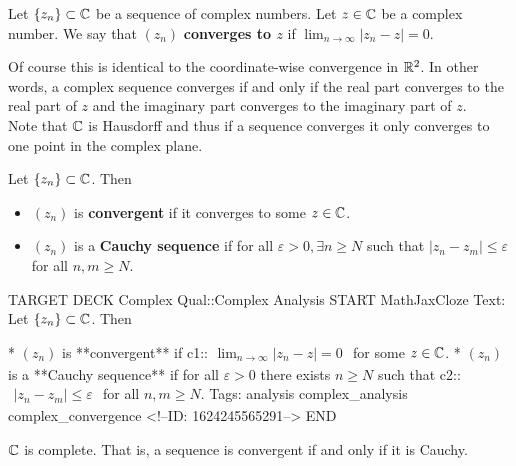 \documentclass{memoir}
\begin{document}
\begin{defn}
	Let \(\left\{ z_n \right\}  \subset \mathbb{C}\) be a sequence of complex numbers. Let \(z \in \mathbb{C}\) be a complex number. We say that \((z_n)\) \textbf{converges to \(z\)} if \(\lim_{n \to \infty} \left| z_n-z \right| =0\).
\end{defn}
Of course this is identical to the coordinate-wise convergence in \(\mathbb{R}^2\). In other words, a complex sequence converges if and only if the real part converges to the real part of \(z\) and the imaginary part converges to the imaginary part of \(z\).\\

Note that \(\C\) is Hausdorff and thus if a sequence converges it only converges to one point in the complex plane.
\begin{defn}
	Let \(\left\{ z_n \right\} \subset \mathbb{C}\). Then
	\begin{itemize}
		\item \((z_n)\) is \textbf{convergent} if it converges to some \(z \in \mathbb{C}\).
		\item \((z_n)\) is a \textbf{Cauchy sequence} if for all \(\varepsilon>0, \exists n\geq N\) such that \(\left| z_n-z_m \right|\leq \varepsilon\) for all \(n,m \geq N\).
	\end{itemize}
\end{defn}

\begin{anki}
TARGET DECK
Complex Qual::Complex Analysis
START
MathJaxCloze
Text: Let \(\left\{ z_n \right\} \subset \mathbb{C}\). Then

* \((z_n)\) is **convergent** if
{{c1::\(\begin{align*}
        	\lim_{n \to \infty} \left| z_n - z \right| = 0
        \end{align*}\)}} 
for some \(z \in \mathbb{C}\).
* \((z_n)\) is a **Cauchy sequence** if for all \(\varepsilon>0\) there exists \( n\geq N\) such that
 {{c2::\(\begin{align*}
        	\left| z_n-z_m \right|\leq \varepsilon
        \end{align*}\)}} 
for all \(n,m \geq N\).
Tags: analysis complex_analysis complex_convergence
<!--ID: 1624245565291-->
END
\end{anki}


\begin{thm}[Completeness of \(\C\) ]
	\(\C\) is complete. That is, a sequence is convergent if and only if it is Cauchy.
\end{thm}
\end{document}
